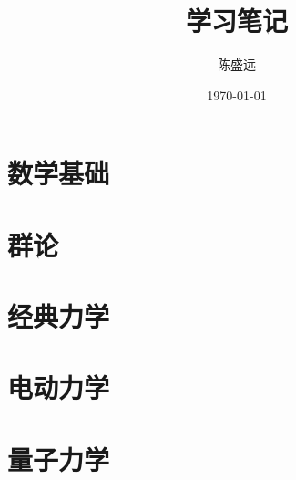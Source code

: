 \documentclass{sybook}
\begin{document}
\begin{sloppypar}

\title{学习笔记}
\author{陈盛远}
\date{\today}
\maketitle

\pagestyle{empty}
\setcounter{page}{0}
\pagestyle{empty}
\tableofcontents
\newpage
\setcounter{page}{1}

\part{数学基础}





\part{群论}


\part{经典力学}






\part{电动力学}




\part{量子力学}








\end{sloppypar}
\end{document}
